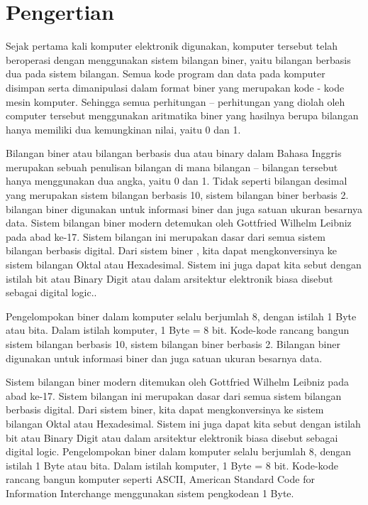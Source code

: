 \documentclass{article}
\begin{document}
\section{Pengertian}

Sejak pertama kali komputer elektronik digunakan, komputer tersebut telah beroperasi dengan menggunakan sistem bilangan biner, yaitu bilangan berbasis dua pada sistem bilangan. Semua kode program dan data pada komputer disimpan serta dimanipulasi dalam format biner yang merupakan kode - kode mesin komputer. Sehingga semua perhitungan – perhitungan yang diolah oleh computer tersebut menggunakan aritmatika biner yang hasilnya berupa bilangan hanya memiliki dua kemungkinan nilai, yaitu 0 dan 1. 

Bilangan biner atau bilangan berbasis dua atau binary dalam Bahasa Inggris merupakan sebuah penulisan bilangan di mana bilangan – bilangan tersebut hanya menggunakan dua angka, yaitu 0 dan 1. Tidak seperti bilangan desimal yang merupakan sistem bilangan berbasis 10, sistem bilangan biner berbasis 2. bilangan biner digunakan untuk informasi biner dan juga satuan ukuran besarnya data. Sistem bilangan biner modern detemukan oleh Gottfried Wilhelm Leibniz pada abad ke-17. Sistem bilangan ini merupakan dasar dari semua sistem bilangan berbasis digital. Dari sistem biner , kita dapat mengkonversinya ke sistem bilangan Oktal atau Hexadesimal. Sistem ini juga dapat kita sebut dengan istilah bit atau Binary Digit atau dalam arsitektur elektronik biasa disebut sebagai digital logic.. 

Pengelompokan biner dalam komputer selalu berjumlah 8, dengan istilah 1 Byte atau bita. Dalam istilah komputer, 1 Byte = 8 bit. Kode-kode rancang bangun sistem bilangan berbasis 10, sistem bilangan biner berbasis 2. Bilangan biner digunakan untuk informasi biner dan juga satuan ukuran besarnya data.

Sistem bilangan biner modern ditemukan oleh Gottfried Wilhelm Leibniz pada abad ke-17. Sistem bilangan ini merupakan dasar dari semua sistem bilangan berbasis digital. Dari sistem biner, kita dapat mengkonversinya ke sistem bilangan Oktal atau Hexadesimal. Sistem ini juga dapat kita sebut dengan istilah bit atau Binary Digit atau dalam arsitektur elektronik biasa disebut sebagai digital logic. Pengelompokan biner dalam komputer selalu berjumlah 8, dengan istilah 1 Byte atau bita. Dalam istilah komputer, 1 Byte = 8 bit. Kode-kode rancang bangun komputer seperti ASCII, American Standard Code for Information Interchange menggunakan sistem pengkodean 1 Byte.
\end{document}
